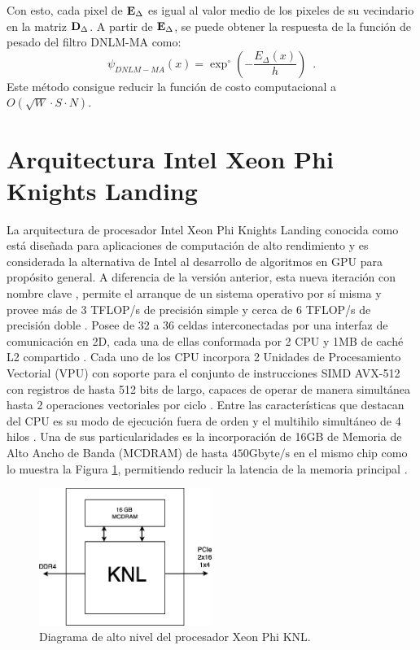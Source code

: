 Con esto, cada pixel de $\mathbf{E}_{\Delta}$ es igual al valor medio de los pixeles de su vecindario en la matriz $\mathbf{D}_{\Delta}$. A partir de $\mathbf{E}_{\Delta}$, se puede obtener la respuesta de la función de pesado del filtro DNLM-MA como: 
%
\begin{equation}
\psi_{DNLM-MA}\left(x\right)=\exp^{\circ}\left(-\frac{ E_\Delta\left(x\right) }{h}\right)  \enspace .
\label{eq:wmoas}
\end{equation}
%
Este m\'etodo consigue reducir la  función de costo computacional a $O(\sqrt{W} \cdot S \cdot N)$.  

\section{Arquitectura Intel Xeon Phi Knights Landing}
\label{ch:marco_xeonphi}

La arquitectura de procesador Intel Xeon Phi Knights Landing conocida como  está dise\~nada para aplicaciones de computación de alto rendimiento y es considerada la alternativa de Intel al desarrollo de algoritmos en GPU para propósito general. A diferencia de la versión anterior, esta nueva iteración con nombre clave , permite el arranque de un sistema operativo por sí misma y provee más de 3 TFLOP/s de precisión simple y cerca de 6 TFLOP/s de precisión doble \cite{Jeffers201663}. Posee de 32 a 36 celdas interconectadas por una interfaz de comunicación en 2D, cada una de ellas conformada por 2 CPU y 1MB de caché L2 compartido \cite{XeonPhiWhitePaper}. Cada uno de los CPU incorpora 2 Unidades de Procesamiento Vectorial (VPU) con soporte para el conjunto de instrucciones SIMD AVX-512 con registros de hasta 512 bits de largo, capaces de operar de manera simult\'anea hasta 2 operaciones vectoriales por ciclo \cite{XeonPhiWhitePaper}. 
Entre las características que destacan del CPU es su modo de ejecución fuera de orden y el multihilo simultáneo de 4 hilos \cite{XeonPhiWhitePaper}. Una de sus particularidades es la incorporación de 16GB de Memoria de Alto Ancho de Banda (MCDRAM) de hasta $450 \text{Gbyte/s}$ en el mismo chip como lo muestra la Figura \ref{fig:cpu_phi}, permitiendo reducir la latencia de la memoria principal \cite{XeonPhiWhitePaper}.

\begin{figure}[htb]
\centering
\includegraphics[width=0.5\textwidth]{fig/cpu}
\caption{Diagrama de alto nivel del procesador Xeon Phi KNL.}
\label{fig:cpu_phi}
\end{figure}


